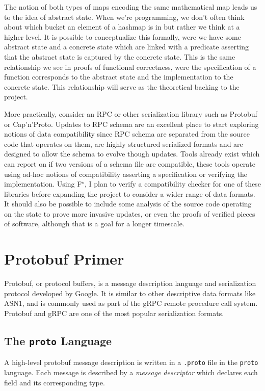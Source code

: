 \documentclass[11pt]{article}
\newcommand{\fstar}{F\(^\star\)}
\theoremstyle{definition}
\begin{document}
The notion of both types of maps encoding the same mathematical map leads us to
the idea of abstract state. When we're programming, we don't often think about
which bucket an element of a hashmap is in but rather we think at a higher
level. It is possible to conceptualize this formally, were we have some abstract
state and a concrete state which are linked with a predicate asserting that the
abstract state is captured by the concrete state. This is the same relationship
we see in proofs of functional correctness, were the specification of a function
corresponds to the abstract state and the implementation to the concrete
state. This relationship will serve as the theoretical backing to the project.

More practically, consider an RPC or other serialization library such as
Protobuf or Cap'n'Proto. Updates to RPC schema are an excellent place to start
exploring notions of data compatibility since RPC schema are separated from the
source code that operates on them, are highly structured serialized formats and
are designed to allow the schema to evolve though updates. Tools already exist
which can report on if two versions of a schema file are compatible, these tools
operate using ad-hoc notions of compatibility asserting a specification or
verifying the implementation. Using \fstar{}, I plan to verify a compatibility
checker for one of these libraries before expanding the project to consider a
wider range of data formats. It should also be possible to include some analysis
of the source code operating on the state to prove more invasive updates, or
even the proofs of verified pieces of software, although that is a goal for a
longer timescale.

\section{Protobuf Primer}

Protobuf, or protocol buffers, is a message description language and
serialization protocol developed by Google. It is similar to other descriptive
data formats like ASN1, and is commonly used as part of the gRPC remote
procedure call system. Protobuf and gRPC are one of the most popular
serialization formats.

\subsection{The \texttt{proto} Language}

A high-level protobuf message description is written in a \texttt{.proto} file
in the \texttt{proto} language. Each message is described by a \emph{message
	descriptor} which declares each field and its corresponding type.
\end{document}
